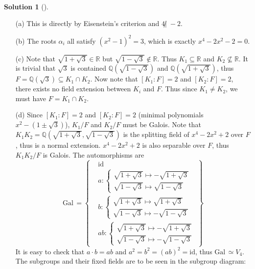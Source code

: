 \documentclass{article}
\theoremstyle{definition}
\newtheorem*{sol}{Solution}
\newenvironment{sols}[1][]{%
  \begin{sol}[#1]$ $\par\nobreak\ignorespaces
}{%
  \end{sol}
}
\newcommand{\QQ}{\mathbb Q}
\newcommand{\RR}{\mathbb R}
\newcommand{\Gal}{\text{Gal}\,}
\newcommand{\id}{\text{id}}
\begin{document}
\begin{sols}
	\begin{enumerate}
		\item[(a)] This is directly by Eisenstein's criterion and $4 \not| \; -2$. 

		\item[(b)] The roots $\alpha_i$ all satisfy $(x^2 - 1)^2 = 3$, which is exactly $x^4 - 2x^2 - 2 = 0$.

		\item[(c)] Note that $\sqrt{1 + \sqrt{3}} \in \RR$ but $\sqrt{1 - \sqrt{3}} \notin \RR$.
			Thus $K_1 \subseteq \RR$ and $K_2 \nsubseteq \RR$.
			It is trivial that $\sqrt{3}$ is contained $\QQ(\sqrt{1 - \sqrt{3}})$ and $\QQ(\sqrt{1 + \sqrt{3}})$, thus $F = \QQ(\sqrt{3}) \subseteq K_1 \cap K_2$.
			Now note that $[K_1:F] = 2$ and $[K_2:F] = 2$, there exists no field extension between $K_i$ and $F$.
			Thus since $K_1 \neq K_2$, we must have $F = K_1 \cap K_2$.

		\item[(d)] Since $[K_1:F] = 2$ and $[K_2:F] = 2$ (minimal polynomials $x^2 - (1 \pm \sqrt{3})$), $K_1/F$ and $K_2/F$ must be Galois.
			Note that $K_1 K_2 = \QQ(\sqrt{1 + \sqrt{3}}, \sqrt{1 - \sqrt{3}})$ is the splitting field of $x^4 - 2 x^2 + 2$ over $F$, thus is a normal extension.
			$x^4 - 2 x^2 + 2$ is also separable over $F$, thus $K_1 K_2/F$ is Galois.
			The automorphisms are
			\[
				\Gal = \left\{
				\begin{aligned}
					&\id\\
					&a: 
					\begin{cases}
						\sqrt{1 + \sqrt{3}} \mapsto - \sqrt{1 + \sqrt{3}}\\
						\sqrt{1 - \sqrt{3}} \mapsto \sqrt{1 - \sqrt{3}}
					\end{cases}\\
					&b: 
					\begin{cases}
						\sqrt{1 + \sqrt{3}} \mapsto \sqrt{1 + \sqrt{3}}\\
						\sqrt{1 - \sqrt{3}} \mapsto - \sqrt{1 - \sqrt{3}}
					\end{cases}\\
					&ab: 
					\begin{cases}
						\sqrt{1 + \sqrt{3}} \mapsto - \sqrt{1 + \sqrt{3}}\\
						\sqrt{1 - \sqrt{3}} \mapsto - \sqrt{1 - \sqrt{3}}
					\end{cases}
				\end{aligned}
				\right\}
			\]
			It is easy to check that $a \cdot b = ab$ and $a^2 = b^2 = (ab)^2 = \id$, thus $\Gal \simeq V_4$.
			The subgroups and their fixed fields are to be seen in the subgroup diagram:


\end{enumerate}
\end{sols}
\end{document}
